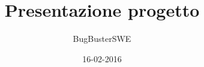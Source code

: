 \documentclass[]{beamer}
\title{Presentazione progetto}
\author{BugBusterSWE}
\date{16-02-2016}
\institute{Progetto MaaS}
\begin{document}
\graphicspath{ {res/img/} }

\begin{frame}
  \titlepage
\end{frame}



\end{document}
